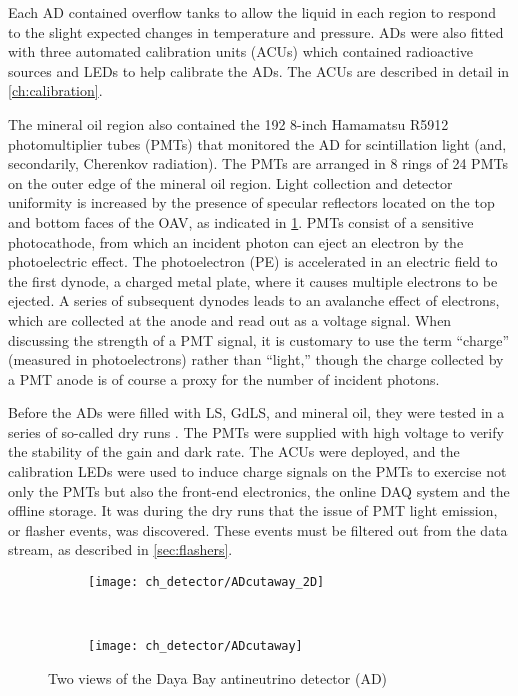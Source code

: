 Each AD contained overflow tanks to allow the liquid in each region
to respond to the slight expected changes in temperature and pressure.
ADs were also fitted with three automated calibration units (ACUs)
which contained radioactive sources and LEDs to help calibrate the ADs.
The ACUs are described in detail in \cref{ch:calibration}.

The mineral oil region also contained the 192 8-inch Hamamatsu R5912
photomultiplier tubes (PMTs) that monitored the AD for scintillation light
(and, secondarily, Cherenkov radiation).
The PMTs are arranged in 8 rings of 24 PMTs on the outer edge of the mineral oil region.
Light collection and detector uniformity is increased by the presence of
specular reflectors located on the top and bottom faces of the OAV,
as indicated in \cref{fig:ad_cutaway}.
PMTs consist of a sensitive photocathode, from which an incident photon
can eject an electron by the photoelectric effect.
The photoelectron (PE) is accelerated in an electric field to the first dynode,
a charged metal plate, where it causes multiple electrons to be ejected.
A series of subsequent dynodes leads to an avalanche effect of electrons,
which are collected at the anode and read out as a voltage signal.
When discussing the strength of a PMT signal,
it is customary to use the term ``charge'' (measured in photoelectrons)
rather than ``light,''
though the charge collected by a PMT anode
is of course a proxy for the number of incident photons.

Before the ADs were filled with LS, GdLS, and mineral oil,
they were tested in a series of so-called dry runs \cite{dryrun1}.
The PMTs were supplied with high voltage
to verify the stability of the gain and dark rate.
The ACUs were deployed, and the calibration LEDs
were used to induce charge signals on the PMTs
to exercise not only the PMTs but also the front-end electronics,
the online DAQ system and the offline storage.
It was during the dry runs that the issue of PMT light emission,
or flasher events, was discovered.
These events must be filtered out from the data stream,
as described in \cref{sec:flashers}.

\begin{figure}
    \centering
    \begin{subfigure}{\textwidth}
        \centering
        \texttt{[image: ch\_detector/ADcutaway\_2D]}
    \end{subfigure}
    \vspace{1cm}\\
    \begin{subfigure}[0.4\textheight]{\textwidth}
        \centering
        \texttt{[image: ch\_detector/ADcutaway]}
    \end{subfigure}
    \caption{Two views of the Daya Bay antineutrino detector (AD)}
    \label{fig:ad_cutaway}
\end{figure}

